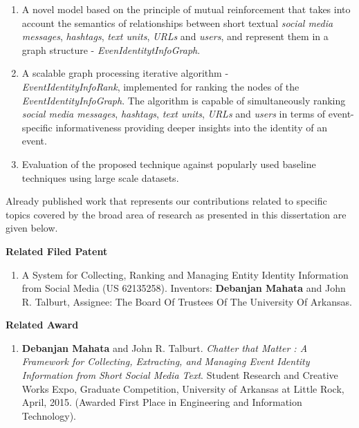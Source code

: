 \begin{enumerate}

\item A novel model based on the principle of mutual reinforcement that takes into account the semantics of relationships between short textual \textit{social media messages}, \textit{hashtags}, \textit{text units}, \textit{URLs} and \textit{users}, and represent them in a graph structure - \textit{EvenIdentitytInfoGraph}. 

\item A scalable graph processing iterative algorithm - \\ \textit{EventIdentityInfoRank}, implemented for ranking the nodes of the \textit{EventIdentityInfoGraph}. The algorithm is capable of simultaneously ranking \textit{social media messages}, \textit{hashtags}, \textit{text units}, \textit{URLs} and \textit{users} in terms of event-specific informativeness providing deeper insights into the identity of an event.

\item Evaluation of the proposed technique against popularly used baseline techniques using large scale datasets.

\end{enumerate}

Already published work that represents our contributions related to specific topics covered by the broad area of research as presented in this dissertation are given below.

\textbf{\LARGE Related Filed Patent}
\begin{enumerate}
\item A System for Collecting, Ranking and Managing Entity Identity Information from Social Media (US 62135258). Inventors: \textbf{Debanjan Mahata} and John R. Talburt, Assignee: The Board Of Trustees Of The University Of Arkansas.
\end{enumerate}

\textbf{\LARGE Related Award}
\begin{enumerate}
\item \textbf{Debanjan Mahata} and John R. Talburt. \textit{Chatter that Matter : A Framework for Collecting, Extracting, and Managing Event Identity Information from Short Social Media Text}. Student Research and Creative Works Expo, Graduate Competition, University of Arkansas at Little Rock, April, 2015. (Awarded First Place in Engineering and Information Technology).  
\end{enumerate}

